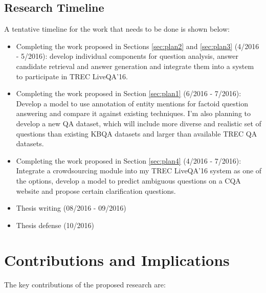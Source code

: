 \subsection{Research Timeline}

\noindent
A tentative timeline for the work that needs to be done is shown below:

\begin{itemize}
\item Completing the work proposed in Sections \ref{sec:plan2} and \ref{sec:plan3} (4/2016 - 5/2016): develop individual components for question analysis, answer candidate retrieval and answer generation and integrate them into a system to participate in TREC LiveQA'16.
\item Completing the work proposed in Section \ref{sec:plan1} (6/2016 - 7/2016): Develop a model to use annotation of entity mentions for factoid question answering and compare it against existing techniques. I'm also planning to develop a new QA dataset, which will include more diverse and realistic set of questions than existing KBQA datasets and larger than available TREC QA datasets.
\item Completing the work proposed in Section \ref{sec:plan4} (4/2016 - 7/2016): Integrate a crowdsourcing module into my TREC LiveQA'16 system as one of the options, develop a model to predict ambiguous questions on a CQA website and propose certain clarification questions.
\item Thesis writing (08/2016 - 09/2016) 
\item Thesis defense (10/2016)
\end{itemize}


\section{Contributions and Implications}

The key contributions of the proposed research are:


